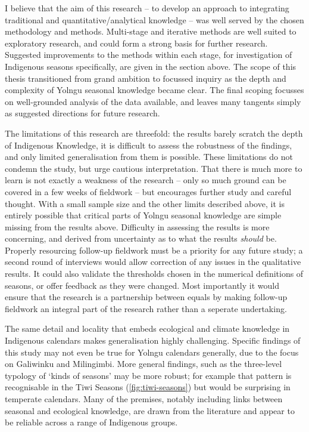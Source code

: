 I believe that the aim of this research -- to develop an approach to
integrating traditional and quantitative/analytical knowledge -- was well
served by the chosen methodology and methods.  Multi-stage and iterative
methods are well suited to exploratory research, and could form a strong
basis for further research.  Suggested improvements to the methods within
each stage, for investigation of Indigenous seasons specifically, are given
in the section above.  The scope of this thesis transitioned from grand
ambition to focussed inquiry as the depth and complexity of Yolngu seasonal
knowledge became clear.  The final scoping focusses on well-grounded analysis
of the data available, and leaves many tangents simply as suggested directions
for future research.

The limitations of this research are threefold:  the results barely scratch
the depth of Indigenous Knowledge, it is difficult to assess the robustness
of the findings, and only limited generalisation from them is possible.  These
limitations do not condemn the study, but urge cautious interpretation.
%
That there is much more to learn is not exactly a weakness of the research --
only so much ground can be covered in a few weeks of fieldwork -- but
encourages further study and careful thought.  With a small sample size and
the other limits described above, it is entirely possible that critical parts
of Yolngu seasonal knowledge are simple missing from the results above.
%
Difficulty in assessing the results is more concerning, and derived from
uncertainty as to what the results \textit{should} be.   Properly resourcing
follow-up fieldwork must be a priority for any future study; a second round
of interviews would allow correction of any issues in the qualitative results.
It could also validate the thresholds chosen in the numerical definitions of
seasons, or offer feedback as they were changed.  Most importantly it would
ensure that the research is a partnership between equals by making follow-up
fieldwork an integral part of the research rather than a seperate undertaking.

The same detail and locality that embeds ecological and climate knowledge in
Indigenous calendars makes generalisation highly challenging.  Specific
findings of this study may not even be true for Yolngu calendars generally,
due to the focus on Galiwinku and Milingimbi.  More general findings, such as
the three-level typology of `kinds of seasons' may be more robust; for example
that pattern is recognisable in the Tiwi Seasons (\cref{fig:tiwi-seasons})
but would be surprising in temperate calendars.  Many of the premises, notably
including links between seasonal and ecological knowledge, are drawn from the
literature and appear to be reliable across a range of Indigenous groups.



